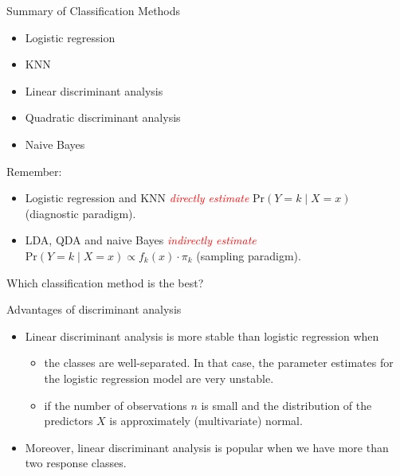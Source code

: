 \documentclass[
  10pt,
  ignorenonframetext,
]{beamer}
\providecommand{\tightlist}{%
  \setlength{\itemsep}{0pt}\setlength{\parskip}{0pt}}
\begin{document}
\begin{frame}
\begin{block}{Summary of Classification Methods}
\protect\hypertarget{summary-of-classification-methods}{}
\(~\)

\begin{itemize}
\item
  Logistic regression
\item
  KNN
\item
  Linear discriminant analysis
\item
  Quadratic discriminant analysis
\item
  Naive Bayes
\end{itemize}

\vspace{4mm}

Remember:

\begin{itemize}
\tightlist
\item
  Logistic regression and KNN \emph{\textcolor{red}{directly estimate}}
  \(\text{Pr}(Y=k \mid X=x)\) (diagnostic paradigm).
\item
  LDA, QDA and naive Bayes \emph{\textcolor{red}{indirectly estimate}}
  \(\text{Pr}(Y=k \mid X=x) \propto f_k(x) \cdot \pi_k\) (sampling
  paradigm).
\end{itemize}

\vspace{2mm}
\end{block}
\end{frame}

\begin{frame}{Which classification method is the best?}
\protect\hypertarget{which-classification-method-is-the-best}{}
\begin{block}{Advantages of discriminant analysis}
\protect\hypertarget{advantages-of-discriminant-analysis}{}
\(~\)

\begin{itemize}
\tightlist
\item
  Linear discriminant analysis is more stable than logistic regression
  when

  \begin{itemize}
  \tightlist
  \item
    the classes are well-separated. In that case, the parameter
    estimates for the logistic regression model are very unstable.
  \item
    if the number of observations \(n\) is small and the distribution of
    the predictors \(X\) is approximately (multivariate) normal.
  \end{itemize}
\end{itemize}

\vspace{2mm}

\begin{itemize}
\tightlist
\item
  Moreover, linear discriminant analysis is popular when we have more
  than two response classes.
\end{itemize}
\end{block}
\end{frame}
\end{document}
